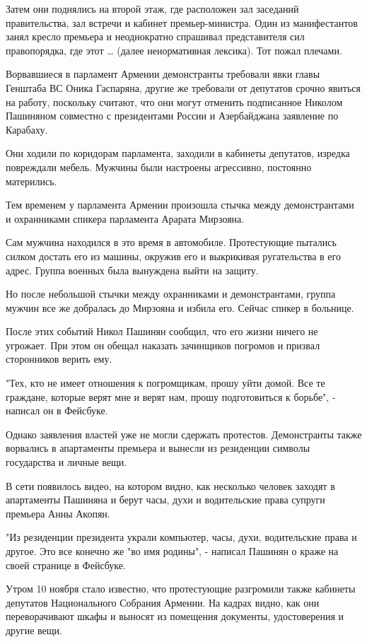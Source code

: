 Затем они поднялись на второй этаж, где расположен зал заседаний правительства,
зал встречи и кабинет премьер-министра. Один из манифестантов занял кресло
премьера и неоднократно спрашивал представителя сил правопорядка, где этот …
(далее ненормативная лексика). Тот пожал плечами.

Ворвавшиеся в парламент Армении демонстранты требовали явки главы Генштаба ВС
Оника Гаспаряна, другие же требовали от депутатов срочно явиться на работу,
поскольку считают, что они могут отменить подписанное Николом Пашиняном
совместно с президентами России и Азербайджана заявление по Карабаху. 

Они ходили по коридорам парламента, заходили в кабинеты депутатов, изредка
повреждали мебель. Мужчины были настроены агрессивно, постоянно матерились. 

Тем временем у парламента Армении произошла стычка между демонстрантами и
охранниками спикера парламента Арарата Мирзояна.

Сам мужчина находился в это время в автомобиле. Протестующие пытались силком
достать его из машины, окружив его и выкрикивая ругательства в его адрес.
Группа военных была вынуждена выйти на защиту.

Но после небольшой стычки между охранниками и демонстрантами, группа мужчин все
же добралась до Мирзояна и избила его. Сейчас спикер в больнице.

После этих событий Никол Пашинян сообщил, что его жизни ничего не угрожает. При
этом он обещал наказать зачинщиков погромов и призвал сторонников верить ему.

"Тех, кто не имеет отношения к погромщикам, прошу уйти домой. Все те граждане,
которые верят мне и верят нам, прошу подготовиться к борьбе", - написал он в
Фейсбуке.

Однако заявления властей уже не могли сдержать протестов. Демонстранты также
ворвались в апартаменты премьера и вынесли из резиденции символы государства и
личные вещи.

В сети появилось видео, на котором видно, как несколько человек заходят в
апартаменты Пашиняна и берут часы, духи и водительские права супруги премьера
Анны Акопян.

"Из резиденции президента украли компьютер, часы, духи, водительские права и
другое. Это все конечно же "во имя родины", - написал Пашинян о краже на своей
странице в Фейсбуке.

Утром 10 ноября стало известно, что протестующие разгромили также кабинеты
депутатов Национального Собрания Армении. На кадрах видно, как они
переворачивают шкафы и выносят из помещения документы, удостоверения и другие
вещи.

